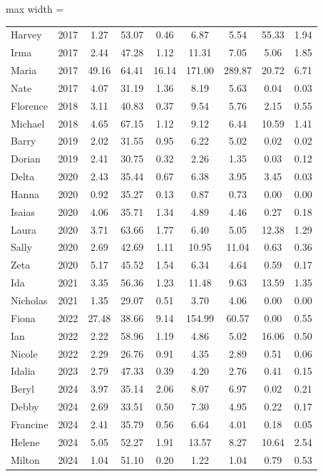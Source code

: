 \begin{table}
\begin{adjustbox}{max width = \textwidth}
\begin{threeparttable}
\begin{tabular}[t]{lcccccccc}
Harvey & 2017 & 1.27 & 53.07 & 0.46 & 6.87 & 5.54 & 55.33 & 1.94\\
Irma & 2017 & 2.44 & 47.28 & 1.12 & 11.31 & 7.05 & 5.06 & 1.85\\
Maria & 2017 & 49.16 & 64.41 & 16.14 & 171.00 & 289.87 & 20.72 & 6.71\\
Nate & 2017 & 4.07 & 31.19 & 1.36 & 8.19 & 5.63 & 0.04 & 0.03\\
Florence & 2018 & 3.11 & 40.83 & 0.37 & 9.54 & 5.76 & 2.15 & 0.55\\
Michael & 2018 & 4.65 & 67.15 & 1.12 & 9.12 & 6.44 & 10.59 & 1.41\\
Barry & 2019 & 2.02 & 31.55 & 0.95 & 6.22 & 5.02 & 0.02 & 0.02\\
Dorian & 2019 & 2.41 & 30.75 & 0.32 & 2.26 & 1.35 & 0.03 & 0.12\\
Delta & 2020 & 2.43 & 35.44 & 0.67 & 6.38 & 3.95 & 3.45 & 0.03\\
Hanna & 2020 & 0.92 & 35.27 & 0.13 & 0.87 & 0.73 & 0.00 & 0.00\\
Isaias & 2020 & 4.06 & 35.71 & 1.34 & 4.89 & 4.46 & 0.27 & 0.18\\
Laura & 2020 & 3.71 & 63.66 & 1.77 & 6.40 & 5.05 & 12.38 & 1.29\\
Sally & 2020 & 2.69 & 42.69 & 1.11 & 10.95 & 11.04 & 0.63 & 0.36\\
Zeta & 2020 & 5.17 & 45.52 & 1.54 & 6.34 & 4.64 & 0.59 & 0.17\\
Ida & 2021 & 3.35 & 56.36 & 1.23 & 11.48 & 9.63 & 13.59 & 1.35\\
Nicholas & 2021 & 1.35 & 29.07 & 0.51 & 3.70 & 4.06 & 0.00 & 0.00\\
Fiona & 2022 & 27.48 & 38.66 & 9.14 & 154.99 & 60.57 & 0.00 & 0.55\\
Ian & 2022 & 2.22 & 58.96 & 1.19 & 4.86 & 5.02 & 16.06 & 0.50\\
Nicole & 2022 & 2.29 & 26.76 & 0.91 & 4.35 & 2.89 & 0.51 & 0.06\\
Idalia & 2023 & 2.79 & 47.33 & 0.39 & 4.20 & 2.76 & 0.41 & 0.15\\
Beryl & 2024 & 3.97 & 35.14 & 2.06 & 8.07 & 6.97 & 0.02 & 0.21\\
Debby & 2024 & 2.69 & 33.51 & 0.50 & 7.30 & 4.95 & 0.22 & 0.17\\
Francine & 2024 & 2.41 & 35.79 & 0.56 & 6.64 & 4.01 & 0.18 & 0.05\\
Helene & 2024 & 5.05 & 52.27 & 1.91 & 13.57 & 8.27 & 10.64 & 2.54\\
Milton & 2024 & 1.04 & 51.10 & 0.20 & 1.22 & 1.04 & 0.79 & 0.53\\

\end{tabular}
\end{threeparttable}
\end{adjustbox}
\end{table}
